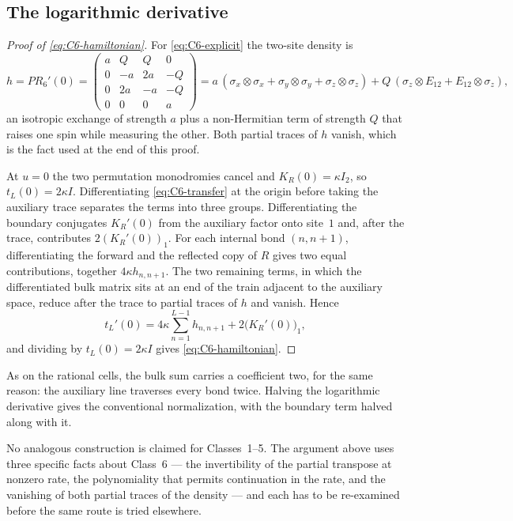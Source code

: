 \documentclass[11pt,reqno]{amsart}
\theoremstyle{plain}
\theoremstyle{definition}
\theoremstyle{remark}
\numberwithin{equation}{section}
\newcommand{\Id}{I_2}
\begin{document}
\subsection{The logarithmic derivative}

\begin{proof}[Proof of \cref{eq:C6-hamiltonian}]
For \cref{eq:C6-explicit} the two-site density is
\begin{equation}
h=P R_6'(0)=
\begin{pmatrix}
a&Q&Q&0\\
0&-a&2a&-Q\\
0&2a&-a&-Q\\
0&0&0&a
\end{pmatrix}
=a\,(\sigma_x\otimes\sigma_x+\sigma_y\otimes\sigma_y+\sigma_z\otimes\sigma_z)
+Q\,(\sigma_z\otimes E_{12}+E_{12}\otimes\sigma_z),
\label{eq:C6-density}
\end{equation}
an isotropic exchange of strength $a$ plus a non-Hermitian term of strength $Q$
that raises one spin while measuring the other. Both partial traces of $h$
vanish, which is the fact used at the end of this proof.

At $u=0$ the two permutation monodromies cancel and $K_R(0)=\kappa\Id$, so
$t_L(0)=2\kappa I$. Differentiating \cref{eq:C6-transfer} at the origin before
taking the auxiliary trace separates the terms into three groups. Differentiating
the boundary conjugates $K_R'(0)$ from the auxiliary factor onto site~$1$ and,
after the trace, contributes $2(K_R'(0))_1$. For each internal bond $(n,n+1)$,
differentiating the forward and the reflected copy of $R$ gives two equal
contributions, together $4\kappa h_{n,n+1}$. The two remaining terms, in which
the differentiated bulk matrix sits at an end of the train adjacent to the
auxiliary space, reduce after the trace to partial traces of $h$ and vanish.
Hence
\begin{equation}
t_L'(0)=4\kappa\sum_{n=1}^{L-1}h_{n,n+1}+2\bigl(K_R'(0)\bigr)_1,
\label{eq:C6-derivative}
\end{equation}
and dividing by $t_L(0)=2\kappa I$ gives \cref{eq:C6-hamiltonian}.
\end{proof}

As on the rational cells, the bulk sum carries a coefficient two, for the same
reason: the auxiliary line traverses every bond twice. Halving the logarithmic
derivative gives the conventional normalization, with the boundary term halved
along with it.

No analogous construction is claimed for Classes~1--5. The argument above uses
three specific facts about Class~6 --- the invertibility of the partial transpose
at nonzero rate, the polynomiality that permits continuation in the rate, and the
vanishing of both partial traces of the density --- and each has to be re-examined
before the same route is tried elsewhere.
\end{document}
